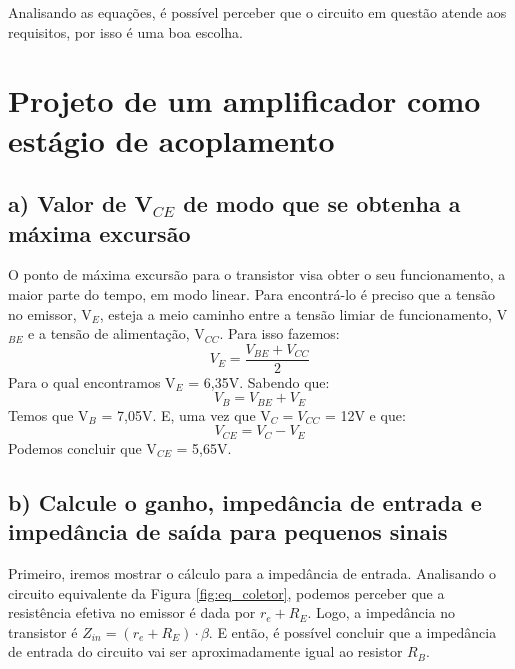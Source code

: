 \documentclass{article}
\begin{document}
        Analisando as equações, é possível perceber que o circuito em questão atende aos requisitos, por isso é uma boa escolha.
        
    \section{Projeto de um amplificador como estágio de acoplamento}
        \subsection{a) Valor de V$_{CE}$ de modo que se obtenha a máxima excursão}
            O ponto de máxima excursão para o transistor visa obter o seu funcionamento, a maior parte do tempo, em modo linear. Para encontrá-lo é preciso que a tensão no emissor, V$_E$, esteja a meio caminho entre a tensão limiar de funcionamento, V$_{BE}$ e a tensão de alimentação, V$_{CC}$. Para isso fazemos:
            \begin{equation}
                V_E = \frac{V_{BE} + V_{CC}}{2}
            \end{equation}
            Para o qual encontramos V$_E$ = 6,35V. Sabendo que:
            \begin{equation}
                V_B = V_{BE} + V_E
            \end{equation}
            Temos que V$_B$ = 7,05V. E, uma vez que V$_{C} = V_{CC}$ = 12V e que:
            \begin{equation}
                V_{CE} = V_C - V_E
            \end{equation}
            Podemos concluir que V$_{CE}$ = 5,65V.
        
        \subsection{b) Calcule o ganho, impedância de entrada e impedância de saída para pequenos sinais}
            Primeiro, iremos mostrar o cálculo para a impedância de entrada. Analisando o circuito equivalente da Figura \ref{fig:eq_coletor}, podemos perceber que a resistência efetiva no emissor é dada por $r_e + R_E$. Logo, a impedância no transistor é $Z_{in} = (r_e + R_E) \cdot \beta $. E então, é possível concluir que a impedância de entrada do circuito vai ser aproximadamente igual ao resistor $R_B$.
            
\end{document}

